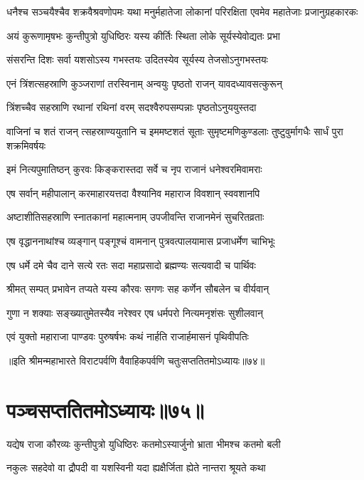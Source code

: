 \threelineshloka
{धनैश्च सञ्चयैश्चैव शक्रवैश्रवणोपमः}
{यथा मनुर्महातेजा लोकानां परिरक्षिता}
{एवमेव महातेजाः प्रजानुग्रहकारकः}


\twolineshloka
{अयं कुरूणामृषभः कुन्तीपुत्रो युधिष्ठिरः}
{यस्य कीर्तिः स्थिता लोके सूर्यस्येवोद्यतः प्रभा}


\twolineshloka
{संसरन्ति दिशः सर्वा यशसोऽस्य गभस्तयः}
{उदितस्येव सूर्यस्य तेजसोऽनुगभस्तयः}


\twolineshloka
{एनं त्रिंशत्सहस्राणि कुञ्जराणां तरस्विनाम्}
{अन्वयुः पृष्ठतो राजन् यावदध्यावसत्कुरून्}


\twolineshloka
{त्रिंशच्चैव सहस्राणि रथानां रथिनां वरम्}
{सदश्वैरुपसम्पन्नाः पृष्ठतोऽनुययुस्तदा}


\threelineshloka
{वाजिनां च शतं राजन् त्सहस्राण्ययुतानि च}
{इममष्टशतं सूताः सुमृष्टमणिकुण्डलाः}
{तुष्टुवुर्मागधैः सार्धं पुरा शक्रमिवर्षयः}


\twolineshloka
{इमं नित्यपुमातिष्ठन् कुरवः किङ्करास्तदा}
{सर्वे च नृप राजानं धनेश्वरमिवामराः}


\twolineshloka
{एष सर्वान् महीपालान् करमाहारयत्तदा}
{वैश्यानिव महाराज विवशान् स्ववशानपि}


\twolineshloka
{अष्टाशीतिसहस्राणि स्नातकानां महात्मनाम्}
{उपजीवन्ति राजानमेनं सुचरितव्रताः}


\twolineshloka
{एष वृद्धाननाथांश्च व्यङ्गान् पङ्गूश्चं वामनान्}
{पुत्रवत्पालयामास प्रजाधर्मेण चाभिभूः}


\twolineshloka
{एष धर्मे दमे चैव दाने सत्ये रतः सदा}
{महाप्रसादो ब्रह्मण्यः सत्यवादी च पार्थिवः}


\twolineshloka
{श्रीमत् सम्पत् प्रभावेन तप्यते यस्य कौरवः}
{सगणः सह कर्णेन सौबलेन च वीर्यवान्}


\twolineshloka
{गुणा न शक्याः सङ्ख्यातुमेतस्यैव नरेश्वर}
{एष धर्मपरो नित्यमनृशंसः सुशीलवान्}


\twolineshloka
{एवं युक्तो महाराजा पाण्डवः पुरुषर्षभः}
{कथं नार्हति राजार्हमासनं पृथिवीपतिः}

॥इति श्रीमन्महाभारते विराटपर्वणि वैवाहिकपर्वणि चतुःसप्ततितमोऽध्यायः॥७४॥

\chapter{पञ्चसप्ततितमोऽध्यायः॥७५॥}

\twolineshloka
{यद्येष राजा कौरव्यः कुन्तीपुत्रो युधिष्ठिरः}
{कतमोऽस्यार्जुनो भ्राता भीमश्च कतमो बली}


\twolineshloka
{नकुलः सहदेवो वा द्रौपदी वा यशस्विनी}
{यदा ह्यक्षैर्जिता ह्येते नान्तरा श्रूयते कथा}

